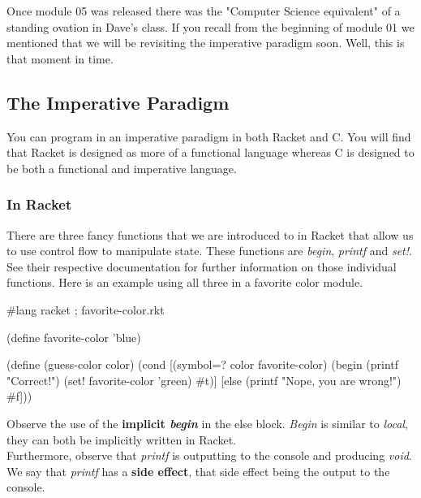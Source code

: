 
Once module 05 was released there was the "Computer Science equivalent" of a standing ovation in Dave's class. If you recall from the beginning of module 01 we mentioned that we will be revisiting the imperative paradigm soon. Well, this is that moment in time.

\subsection{The Imperative Paradigm}

You can program in an imperative paradigm in both Racket and C. You will find that Racket is designed as more of a functional language whereas C is designed to be both a functional and imperative language.

\subsubsection*{In Racket}

There are three fancy functions that we are introduced to in Racket that allow us to use control flow to manipulate state. These functions are \emph{begin}, \emph{printf} and \emph{set!}. See their respective documentation for further information on those individual functions. Here is an example using all three in a favorite color module.\\

\begin{code}[Lisp]
#lang racket ; favorite-color.rkt

(define favorite-color 'blue)

(define (guess-color color)
	(cond
		[(symbol=? color favorite-color) (begin (printf "Correct!")
		                                        (set! favorite-color 'green)
		                                        #t)]
		[else (printf "Nope, you are wrong!") #f]))
\end{code}

Observe the use of the \textbf{implicit \emph{begin}} in the else block. \emph{Begin} is similar to \emph{local}, they can both be implicitly written in Racket.\\

Furthermore, observe that \emph{printf} is outputting to the console and producing \emph{void}. We say that \emph{printf} has a \textbf{side effect}, that side effect being the output to the console.\\

